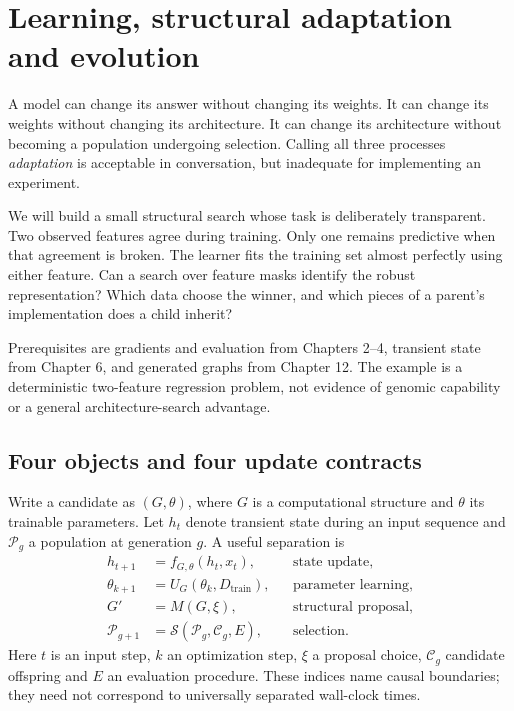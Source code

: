 \chapter{Learning, structural adaptation and evolution}
A model can change its answer without changing its weights. It can change
its weights without changing its architecture. It can change its architecture
without becoming a population undergoing selection. Calling all three
processes \emph{adaptation} is acceptable in conversation, but inadequate
for implementing an experiment.

We will build a small structural search whose task is deliberately
transparent. Two observed features agree during training. Only one remains
predictive when that agreement is broken. The learner fits the training
set almost perfectly using either feature. Can a search over feature
masks identify the robust representation? Which data choose the winner,
and which pieces of a parent's implementation does a child inherit?

Prerequisites are gradients and evaluation from Chapters 2--4, transient
state from Chapter 6, and generated graphs from Chapter 12. The example is
a deterministic two-feature regression problem, not evidence of genomic
capability or a general architecture-search advantage.

\section{Four objects and four update contracts}
Write a candidate as $(G,\theta)$, where $G$ is a computational structure
and $\theta$ its trainable parameters. Let $h_t$ denote transient state
during an input sequence and $\mathcal P_g$ a population at generation $g$.
A useful separation is
\begin{align}
 h_{t+1}&=f_{G,\theta}(h_t,x_t), &&\text{state update},\\
 \theta_{k+1}&=U_G(\theta_k,D_{\mathrm{train}}),&&\text{parameter learning},\\
 G'&=M(G,\xi),&&\text{structural proposal},\\
 \mathcal P_{g+1}&=\mathcal S(\mathcal P_g,\mathcal C_g,E),&&\text{selection}.
 \label{eq:clocks}
\end{align}
Here $t$ is an input step, $k$ an optimization step, $\xi$ a proposal choice,
$\mathcal C_g$ candidate offspring and $E$ an evaluation procedure.
These indices name causal boundaries; they need not correspond to
universally separated wall-clock times.

